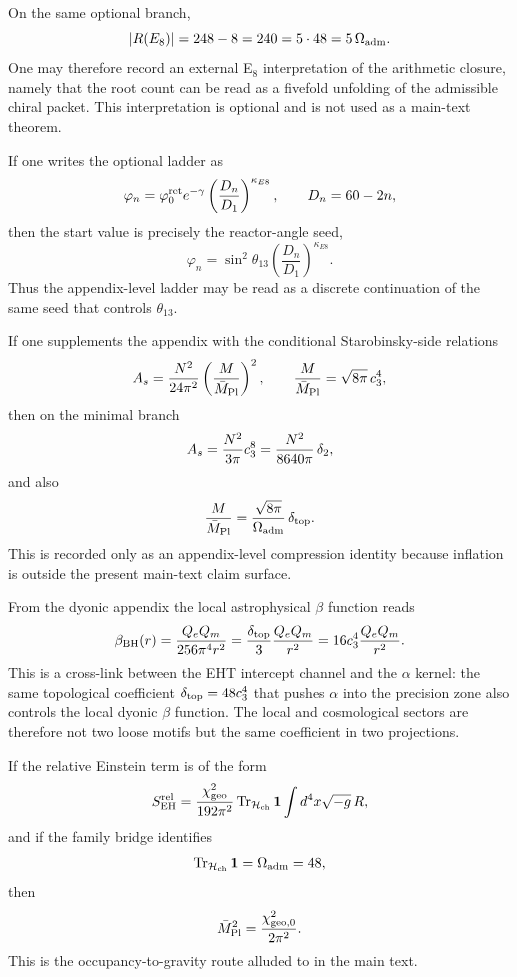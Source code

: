 \begin{remark}
On the same optional branch,
\[
|R(E_8)|=248-8=240=5\cdot48=5\,\Omega_{\mathrm{adm}}.
\]
One may therefore record an external E$_8$ interpretation of the arithmetic closure, namely that
the root count can be read as a fivefold unfolding of the admissible chiral packet. This
interpretation is optional and is not used as a main-text theorem.
\end{remark}

\begin{remark}
If one writes the optional ladder as
\[
\varphi_n=\varphi_0^{\mathrm{ret}} e^{-\gamma}\left(\frac{D_n}{D_1}\right)^{\kappa_{E8}},
\qquad
D_n=60-2n,
\]
then the start value is precisely the reactor-angle seed,
\[
\varphi_n=\sin^2\theta_{13}\left(\frac{D_n}{D_1}\right)^{\kappa_{E8}}.
\]
Thus the appendix-level ladder may be read as a discrete continuation of the same seed that controls $\theta_{13}$.
\end{remark}

\begin{remark}
If one supplements the appendix with the conditional Starobinsky-side relations
\[
A_s=\frac{N^2}{24\pi^2}\left(\frac{M}{\bar M_{\mathrm{Pl}}}\right)^2,
\qquad
\frac{M}{\bar M_{\mathrm{Pl}}}=\sqrt{8\pi}\,c_3^4,
\]
then on the minimal branch
\[
A_s=\frac{N^2}{3\pi}c_3^8=\frac{N^2}{8640\pi}\,\delta_2,
\]
and also
\[
\frac{M}{\bar M_{\mathrm{Pl}}}=\frac{\sqrt{8\pi}}{\Omega_{\mathrm{adm}}}\,\delta_{\mathrm{top}}.
\]
This is recorded only as an appendix-level compression identity because inflation is outside the present main-text claim surface.
\end{remark}

\begin{remark}
From the dyonic appendix the local astrophysical $\beta$ function reads
\[
\beta_{\mathrm{BH}}(r)=\frac{Q_eQ_m}{256\pi^4 r^2}=\frac{\delta_{\mathrm{top}}}{3}\frac{Q_eQ_m}{r^2}=16c_3^4\frac{Q_eQ_m}{r^2}.
\]
This is a cross-link between the EHT intercept channel and the $\alpha$ kernel: the same topological coefficient $\delta_{\mathrm{top}}=48c_3^4$ that pushes $\alpha$ into the precision zone also controls the local dyonic $\beta$ function. The local and cosmological sectors are therefore not two loose motifs but the same coefficient in two projections.
\end{remark}

\begin{remark}
If the relative Einstein term is of the form
\[
S_{\mathrm{EH}}^{\mathrm{rel}}
=
\frac{\chi_{\mathrm{geo}}^2}{192\pi^2}\operatorname{Tr}_{\mathcal H_{\mathrm{ch}}}\mathbf 1
\int d^4x\sqrt{-g}\,R,
\]
and if the family bridge identifies
\[
\operatorname{Tr}_{\mathcal H_{\mathrm{ch}}}\mathbf 1=\Omega_{\mathrm{adm}}=48,
\]
then
\[
\bar M_{\mathrm{Pl}}^2=\frac{\chi_{\mathrm{geo},0}^2}{2\pi^2}.
\]
This is the occupancy-to-gravity route alluded to in the main text.
\end{remark}

